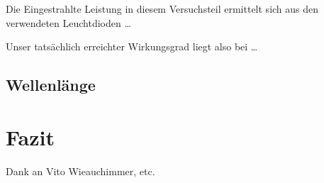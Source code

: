 \documentclass[11pt]{scrartcl}
\begin{document}
Die Eingestrahlte Leistung in diesem Versuchsteil ermittelt sich aus den verwendeten Leuchtdioden \ldots

Unser tatsächlich erreichter Wirkungsgrad liegt also bei \ldots

\subsection{Wellenl\"ange}





\section{Fazit}
Dank an Vito Wieauchimmer, etc.
\end{document}
